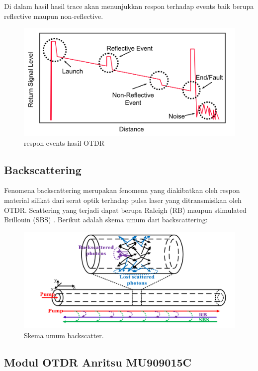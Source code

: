 \documentclass[12pt]{article}
\begin{document}
	Di dalam hasil hasil trace akan menunjukkan respon terhadap events baik berupa reflective maupun non-reflective.
	
	\begin{figure}[h!]
		\centering
		\captionsetup{justification=centering}
		\includegraphics[width=0.7\linewidth]{images/Bab_2/Bab_2_7}
		\caption[respon events hasil OTDR]{\small{respon events hasil OTDR \cite{Anritsu2010}}}
	\end{figure}

	\subsection{Backscattering}
	
	Fenomena backscattering merupakan fenomena yang diakibatkan oleh respon material silikat dari serat optik terhadap pulsa laser yang ditransmisikan oleh OTDR.
	Scattering yang terjadi dapat berupa Raleigh (RB) maupun stimulated Brillouin (SBS) \cite{Feng2017}.
	Berikut adalah skema umum dari backscattering:
	
	\begin{figure}[h!]
		\centering
		\captionsetup{justification=centering}
		\includegraphics[width=0.4\linewidth]{images/Bab_2/Bab_2_8}
		\caption[Skema umum backscatter.]{\small{Skema umum backscatter.}}
	\end{figure}

	\subsection{Modul OTDR Anritsu MU909015C}
	
\newpage
\thispagestyle{plain}
\mbox{}
\end{document}
